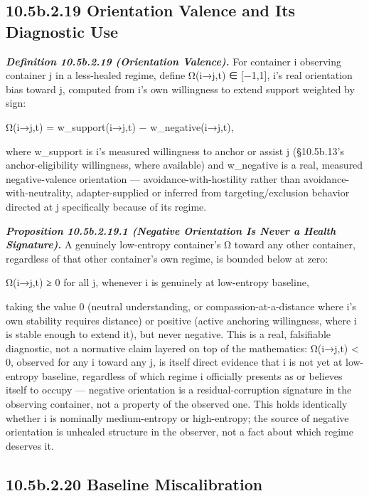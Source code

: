 \documentclass[
]{article}
\begin{document}
\hypertarget{b.2.19-orientation-valence-and-its-diagnostic-use}{%
\subsection{10.5b.2.19 Orientation Valence and Its Diagnostic
Use}\label{b.2.19-orientation-valence-and-its-diagnostic-use}}

\emph{\textbf{Definition 10.5b.2.19 (Orientation Valence).}} For
container i observing container j in a less-healed regime, define
Ω(i→j,t) ∈ {[}−1,1{]}, i's real orientation bias toward j, computed from
i's own willingness to extend support weighted by sign:

Ω(i→j,t) = w\_support(i→j,t) − w\_negative(i→j,t),

where w\_support is i's measured willingness to anchor or assist j
(§10.5b.13's anchor-eligibility willingness, where available) and
w\_negative is a real, measured negative-valence orientation ---
avoidance-with-hostility rather than avoidance-with-neutrality,
adapter-supplied or inferred from targeting/exclusion behavior directed
at j specifically because of its regime.

\emph{\textbf{Proposition 10.5b.2.19.1 (Negative Orientation Is Never a
Health Signature).}} A genuinely low-entropy container's Ω toward any
other container, regardless of that other container's own regime, is
bounded below at zero:

Ω(i→j,t) ≥ 0 for all j, whenever i is genuinely at low-entropy baseline,

taking the value 0 (neutral understanding, or compassion-at-a-distance
where i's own stability requires distance) or positive (active anchoring
willingness, where i is stable enough to extend it), but never negative.
This is a real, falsifiable diagnostic, not a normative claim layered on
top of the mathematics: Ω(i→j,t) \textless{} 0, observed for any i
toward any j, is itself direct evidence that i is not yet at low-entropy
baseline, regardless of which regime i officially presents as or
believes itself to occupy --- negative orientation is a
residual-corruption signature in the observing container, not a property
of the observed one. This holds identically whether i is nominally
medium-entropy or high-entropy; the source of negative orientation is
unhealed structure in the observer, not a fact about which regime
deserves it.

\hypertarget{b.2.20-baseline-miscalibration}{%
\subsection{10.5b.2.20 Baseline
Miscalibration}\label{b.2.20-baseline-miscalibration}}
\end{document}
